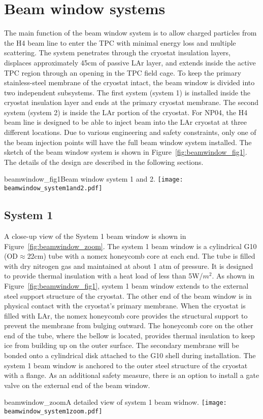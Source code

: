 \section{Beam window systems}
\label{sec:beamwindow}
The main function of the beam window system is to allow charged particles from the H4 beam line to enter the TPC with minimal energy loss and multiple scattering. The system penetrates through the cryostat insulation layers, displaces approximately 45cm of passive LAr layer, and extends inside the active TPC region through an opening in the TPC field cage. To keep the primary stainless-steel membrane of the cryostat intact, the beam window is divided into two independent subsystems. The first system (system 1) is installed inside the cryostat insulation layer and ends at the primary cryostat membrane. The second system (system 2) is inside the LAr portion of the cryostat. For NP04, the H4 beam line is designed to be able to inject beam into the LAr cryostat at three different locations. Due to various engineering and safety constraints, only one of the beam injection points will have the full beam window system installed. The sketch of the beam window system is shown in Figure~\ref{fig:beamwindow_fig1}. The details of the design are described in the following sections.
\begin{cdrfigure}{beamwindow_fig1}{Beam window system 1 and 2.}
  \texttt{[image: beamwindow\_system1and2.pdf]}
\end{cdrfigure}

\subsection{System 1}
A close-up view of the System 1 beam window is shown in Figure~\ref{fig:beamwindow_zoom}. The system 1 beam window is a cylindrical G10 (OD$\approx$22cm) tube with a nomex honeycomb core at each end. The tube is filled with dry nitrogen gas and maintained at about 1 atm of pressure. It is designed to provide thermal insulation with a heat load of less than 5W/$m^2$. As shown in Figure~\ref{fig:beamwindow_fig1}, system 1 beam window extends to the external steel support structure of the cryostat. The other end of the beam window is in physical contact with the cryostat's primary membrane. When the cryostat is filled with LAr, the nomex honeycomb core provides the structural support to prevent the membrane from bulging outward. The honeycomb core on the other end of the tube, where the bellow is located, provides thermal insulation to keep ice from building up on the outer surface. The secondary membrane will be bonded onto a cylindrical disk attached to the G10 shell during installation. The system 1 beam window is anchored to the outer steel structure of the cryostat with a flange. As an additional safety measure, there is an option to install a gate valve on the external end of the beam window.
\begin{cdrfigure}{beamwindow_zoom}{A detailed view of system 1 beam widnow.}
  \texttt{[image: beamwindow\_system1zoom.pdf]}
\end{cdrfigure}


